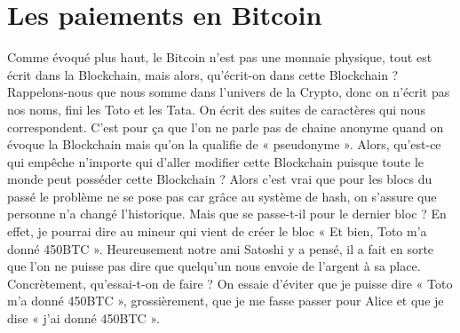 \documentclass{bredele} %
\begin{document}
    \chapter{Les paiements en Bitcoin}
    Comme évoqué plus haut, le Bitcoin n’est pas une monnaie physique, tout est écrit dans la Blockchain, mais alors, qu’écrit-on dans cette Blockchain ?
\newline
    \newline
    Rappelons-nous que nous somme dans l’univers de la Crypto, donc on n’écrit pas nos noms, fini les Toto et les Tata. On écrit des suites de caractères qui nous correspondent. C’est pour ça que l’on ne parle pas de chaine anonyme quand on évoque la Blockchain mais qu’on la qualifie de « pseudonyme ».
    \newline
    Alors, qu’est-ce qui empêche n’importe qui d’aller modifier cette Blockchain puisque toute le monde peut posséder cette Blockchain ? Alors c’est vrai que pour les blocs du passé le problème ne se pose pas car grâce au système de hash, on s’assure que personne n’a changé l’historique. Mais que se passe-t-il pour le dernier bloc ? En effet, je pourrai dire au mineur qui vient de créer le bloc « Et bien, Toto m’a donné 450BTC ».
    \newline
    Heureusement notre ami Satoshi y a pensé, il a fait en sorte que l’on ne puisse pas dire que quelqu’un nous envoie de l’argent à sa place.
\newline
    \newline
    Concrètement, qu’essai-t-on de faire ? On essaie d’éviter que je puisse dire « Toto m’a donné 450BTC », grossièrement, que je me fasse passer pour Alice et que je dise « j’ai donné 450BTC ».
\end{document}
